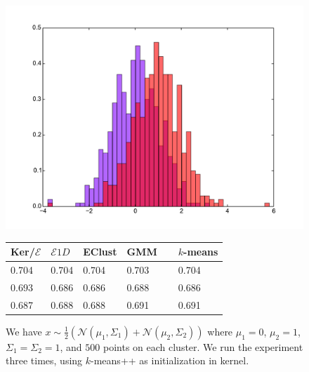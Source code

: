 \documentclass[aps,preprint,nofootinbib,floatfix]{revtex4-1}
\begin{document}
\begin{figure}[h]
\begin{minipage}{.49\textwidth}
\includegraphics[scale=.45]{hist_gauss2.pdf}
\end{minipage}
\begin{minipage}{.49\textwidth}
\begin{tabular}{ l l l l l}
\hline
Ker/$\mathcal{E}$ & $\mathcal{E} 1D$ & EClust & GMM~~ & $k$-means \\
\hline
0.704 &
0.704 &
0.704 &
0.703 &
0.704 \\
0.693 &
0.686 &
0.686 &
0.688 &
0.686 \\
0.687 &
0.688 &
0.688 &
0.691 &
0.691 \\
\hline
\end{tabular}
\end{minipage}
\caption{\label{fig:1dgaus1}
We have $x \sim \tfrac{1}{2}\left( \mathcal{N}(\mu_1, \Sigma_1) +
\mathcal{N}(\mu_2, \Sigma_2)\right)$ where $\mu_1 = 0$, $\mu_2=1$,
$\Sigma_1 = \Sigma_2 = 1$,
and $500$ points on each cluster. We run the experiment three times,
using $k$-means++ as initialization in kernel.
}
\end{figure}
\end{document}
